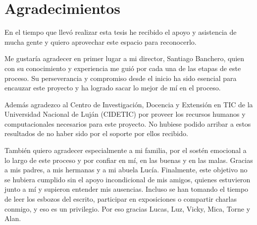 \chapter*{Agradecimientos}

\noindent En el tiempo que llevó realizar esta tesis he recibido el apoyo y
asistencia de mucha gente y quiero aprovechar este espacio para reconocerlo.

Me gustaría agradecer en primer lugar a mi director, Santiago Banchero, quien
con su conocimiento y experiencia me guió por cada una de las etapas de este
proceso. Su perseverancia y compromiso desde el inicio ha sido esencial para
encauzar este proyecto y ha logrado sacar lo mejor de mí en el proceso.

Además agradezco al Centro de Investigación, Docencia y Extensión en TIC de la
Universidad Nacional de Luján (CIDETIC) por proveer los recursos humanos y
computacionales necesarios para este proyecto. No hubiese podido arribar a estos
resultados de no haber sido por el soporte por ellos recibido.

También quiero agradecer especialmente a mi familia, por el sostén emocional a
lo largo de este proceso y por confiar en mí, en las buenas y en las malas.
Gracias a mis padres, a mis hermanas y a mi abuela Lucía.  Finalmente, este
objetivo no se hubiera cumplido sin el apoyo incondicional de mis amigos,
quienes estuvieron junto a mí y supieron entender mis ausencias. Incluso se han
tomando el tiempo de leer los esbozos del escrito, participar en exposiciones o
compartir charlas conmigo, y eso es un privilegio. Por eso gracias Lucas, Luz,
Vicky, Mica, Torne y Alan.
